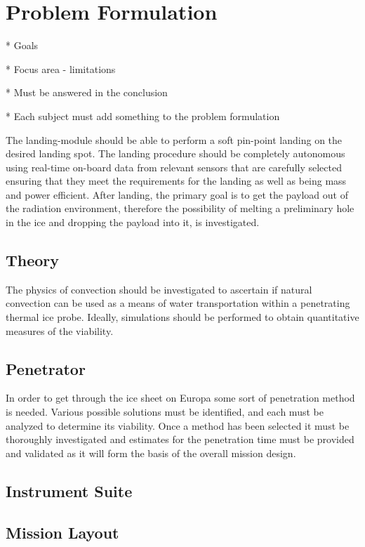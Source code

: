 \chapter{Problem Formulation}

* Goals

* Focus area - limitations

* Must be answered in the conclusion

* Each subject must add something to the problem formulation

The landing-module should be able to perform a soft pin-point landing on the desired landing spot. The landing procedure should be completely autonomous using real-time on-board data from relevant sensors that are carefully selected ensuring that they meet the requirements for the landing as well as being mass and power efficient. After landing, the primary goal is to get the payload out of the radiation environment, therefore the possibility of melting a preliminary hole in the ice and dropping the payload into it, is investigated.

\section{Theory}
The physics of convection should be investigated to ascertain if natural convection can be used as a means of water transportation within a penetrating thermal ice probe. Ideally, simulations should be performed to obtain quantitative measures of the viability.

\section{Penetrator}
In order to get through the ice sheet on Europa some sort of penetration method is needed. Various possible solutions must be identified, and each must be analyzed to determine its viability. Once a method has been selected it must be thoroughly investigated and estimates for the penetration time must be provided and validated as it will form the basis of the overall mission design.

\section{Instrument Suite}

\section{Mission Layout}

